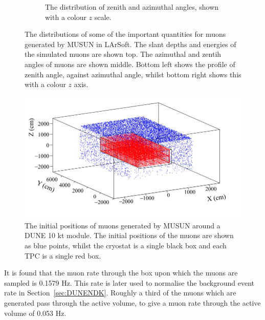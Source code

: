 \begin{figure}[h!]
\begin{subfigure}{0.45\textwidth}
    \caption{The distribution of zenith and azimuthal angles, shown with a colour $z$ scale.}
  \end{subfigure}
  \caption[The distributions of some of the important quantities for muons generated by MUSUN in LArSoft]
          {The distributions of some of the important quantities for muons generated by MUSUN in LArSoft. The slant depths and energies of the simulated muons are shown top. The azimuthal and zentih angles of muons are shown middle. Bottom left shows the profile of zenith angle, against azimuthal angle, whilst bottom right shows this with a colour $z$ axis.}
  \label{fig:MUSUNIncorp}
\end{figure}

\begin{figure}[h!]
  \centering
  \includegraphics[width=\textwidth]{MuonPosCan}
  \caption[The initial positions of muons generated by MUSUN around a DUNE 10 kt module]
          {The initial positions of muons generated by MUSUN around a DUNE 10 kt module. The initial positions of the muons are shown as blue points, whilst the cryostat is a single black box and each TPC is a single red box.}
  \label{fig:10ktPos}
\end{figure}

It is found that the muon rate through the box upon which the muons are sampled is 0.1579 Hz. This rate is later used to normalise the background event rate in Section~\ref{sec:DUNENDK}. Roughly a third of the muons which are generated pass through the active volume, to give a muon rate through the active volume of 0.053 Hz. \\ 


